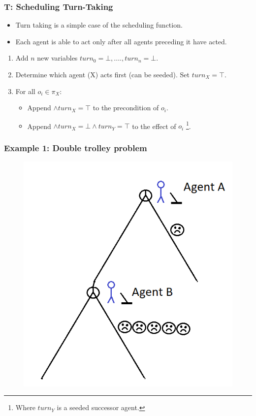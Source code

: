 \documentclass{beamer}
\begin{document}
\begin{frame}
\frametitle{T: Scheduling Turn-Taking}
\begin{itemize}
\item Turn taking is a simple case of the scheduling function.
\item Each agent is able to act only after all agents preceding it have acted.
\end{itemize}

\begin{enumerate}

\item Add $n$ new variables $turn_0=\bot, ...., turn_n=\bot$.
\item Determine which agent (X) acts first (can be seeded). Set $turn_X=\top$.
\item For all $o_i \in \pi_X$:
\begin{itemize}
\item Append $\land turn_X = \top$ to the precondition of $o_i$.
\item Append $\land turn_X = \bot \land turn_Y = \top$ to the effect of $o_i$ \footnote{Where $turn_Y$ is a seeded successor agent.}.
\end{itemize}
\end{enumerate}

\end{frame} 

\begin{frame}
\frametitle{Example 1: Double trolley problem}

\begin{figure}
\includegraphics[scale=1]{extended1}
\end{figure}
\end{frame}
\end{document}
